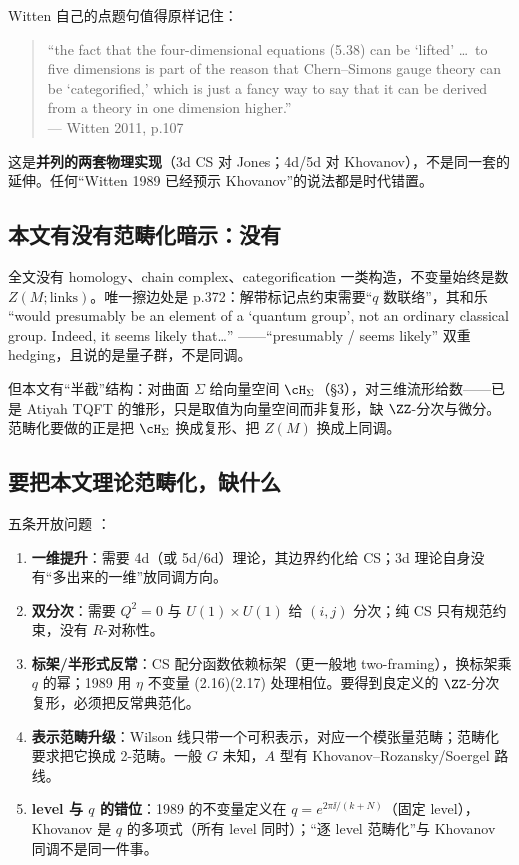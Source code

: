 Witten 自己的点题句值得原样记住：
\begin{quote}
``the fact that the four-dimensional equations (5.38) can be `lifted' \dots\ to five dimensions is part of the reason that Chern--Simons gauge theory can be `categorified,' which is just a fancy way to say that it can be derived from a theory in one dimension higher.''\\[2pt]
\hfill --- Witten 2011, p.107
\end{quote}

这是\textbf{并列的两套物理实现}（3d CS 对 Jones；4d/5d 对 Khovanov），不是同一套的延伸。任何“Witten 1989 已经预示 Khovanov”的说法都是时代错置。

\subsection{本文有没有范畴化暗示：没有}

全文没有 homology、chain complex、categorification 一类构造，不变量始终是数 $Z(M;\text{links})$。唯一擦边处是 p.372：解带标记点约束需要“$q$ 数联络”，其和乐 “would presumably be an element of a `quantum group', not an ordinary classical group. Indeed, it seems likely that\dots” ——“presumably / seems likely” 双重 hedging，且说的是量子群，不是同调。

但本文有“半截”结构：对曲面 $\Sigma$ 给向量空间 $\cH_\Sigma$（§3），对三维流形给数——已是 Atiyah TQFT 的雏形，只是取值为向量空间而非复形，缺 $\ZZ$-分次与微分。范畴化要做的正是把 $\cH_\Sigma$ 换成复形、把 $Z(M)$ 换成上同调。

\subsection{要把本文理论范畴化，缺什么}

五条开放问题 \ours：
\begin{enumerate}[leftmargin=2em]
\item \textbf{一维提升}：需要 4d（或 5d/6d）理论，其边界约化给 CS；3d 理论自身没有“多出来的一维”放同调方向。
\item \textbf{双分次}：需要 $Q^2=0$ 与 $U(1)\times U(1)$ 给 $(i,j)$ 分次；纯 CS 只有规范约束，没有 $R$-对称性。
\item \textbf{标架/半形式反常}：CS 配分函数依赖标架（更一般地 two-framing），换标架乘 $q$ 的幂；1989 用 $\eta$ 不变量 (2.16)(2.17) 处理相位。要得到良定义的 $\ZZ$-分次复形，必须把反常典范化。
\item \textbf{表示范畴升级}：Wilson 线只带一个可积表示，对应一个模张量范畴；范畴化要求把它换成 2-范畴。一般 $G$ 未知，$A$ 型有 Khovanov--Rozansky/Soergel 路线。
\item \textbf{level 与 $q$ 的错位}：1989 的不变量定义在 $q=e^{2\pi\ii/(k+N)}$（固定 level），Khovanov 是 $q$ 的多项式（所有 level 同时）；“逐 level 范畴化”与 Khovanov 同调不是同一件事。
\end{enumerate}

